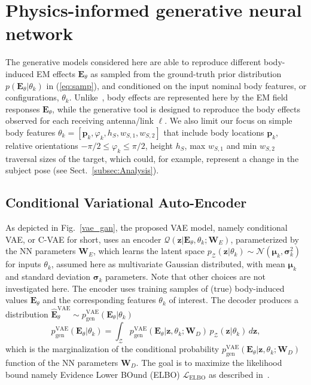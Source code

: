 \section{Physics-informed generative neural network \label{sec:EM-informed-generative-models}}

The generative models considered here are able to reproduce different body-induced EM effects $\mathbf{E}_{\theta}$ as sampled from the ground-truth prior distribution $p(\mathbf{E}_{\theta}|\theta_{k})$ in (\ref{eq:samp}), and conditioned on the input nominal body features, or configurations, $\theta_{k}$. Unlike~\cite{generation}, body effects are represented here by the EM field responses $\mathbf{E}_{\theta}$, while the generative tool is designed to reproduce the body effects observed for each receiving antenna/link $\ell$. We also limit our focus on simple body features $\theta_{k}=\left[\mathbf{p}_{k},\varphi_{k},h_{S},w_{S,1},w_{S,2}\right]$ that include body locations $\mathbf{p}_{k}$, relative orientations $-\pi/2\leq\varphi_{k}\leq\pi/2$, height $h_{S}$, max $w_{S,1}$ and min $w_{S,2}$ traversal sizes of the target, which could, for example, represent a change in the subject pose (see Sect.~\ref{subsec:Analysis}). 

\subsection{Conditional Variational Auto-Encoder}

As depicted in Fig.~\ref{vae_gan}, the proposed VAE model, namely conditional VAE, or C-VAE for short, uses an encoder $\mathcal{Q}(\mathbf{z}|\mathbf{E}_{\theta},\theta_{k};\mathbf{W}_{E})$, parameterized by the NN parameters $\mathbf{W}_{E}$, which learns the latent space $p_{\mathcal{Z}}(\mathbf{z}|\theta_{k})\sim\mathcal{N}(\mathbf{\boldsymbol{\mu}_{\mathit{k}}},\boldsymbol{\sigma}_{k}^{2})$ for inputs $\theta_{k}$, assumed here as multivariate Gaussian distributed, with mean $\mathbf{\boldsymbol{\mu}_{\mathit{k}}}$ and standard deviation $\boldsymbol{\sigma}_{k}$ parameters. Note that other choices are not investigated here. The encoder uses training samples of (true) body-induced values $\mathbf{E}_{\theta}$ and the corresponding features $\theta_{k}$ of interest. The decoder produces a distribution $\widehat{\mathbf{E}}_{\theta}^{\mathrm{VAE}}\sim p_{\mathrm{gen}}^{\mathrm{VAE}}(\mathbf{E}_{\theta}|\theta_{k})$
\begin{equation}
p_{\mathrm{gen}}^{\mathrm{VAE}}(\mathbf{E}_{\theta}|\theta_{k})=\int_{\mathcal{Z}}p_{\mathrm{gen}}^{\mathrm{VAE}}(\mathbf{E}_{\theta}|\mathbf{z},\theta_{k};\mathbf{W}_{D})\,p_{\mathcal{Z}}(\mathbf{z}|\theta_{k})\,d\mathbf{z},\label{eq:vaegen}
\end{equation}
which is the marginalization of the conditional probability $p_{\mathrm{gen}}^{\mathrm{VAE}}(\mathbf{E}_{\theta}|\mathbf{z},\theta_{k};\mathbf{W}_{D})$ function of the NN parameters $\mathbf{W}_{D}$. The goal is to maximize the likelihood bound namely Evidence Lower BOund (ELBO) $\mathcal{L}_{\mathrm{ELBO}}$ as described in~\cite{vae-1}.

